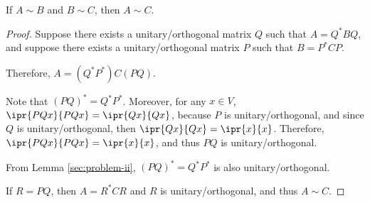 \documentclass[11pt]{scrartcl}
\begin{document}
\begin{lemma}
If $A \sim B$ and $B \sim C$, then $A \sim C$.
\end{lemma}

\begin{proof}
  \hfill

  Suppose there exists a unitary/orthogonal matrix $Q$ such
  that $A = Q^{*} B Q$, and suppose there exists a unitary/orthogonal
  matrix $P$ such that $B = P^{*} C P$.

  Therefore, $A = (Q^{*}P^{*})C (PQ)$.

  Note that $(PQ)^{*} = Q^{*}P^{*}$. Moreover, for any $x\in V$,
  $ \ipr{PQx}{PQx} = \ipr{Qx}{Qx}$, because $P$ is unitary/orthogonal,
  and since $Q$ is unitary/orthogonal, then
  $\ipr{Qx}{Qx} = \ipr{x}{x}$. Therefore,
  $\ipr{PQx}{PQx} = \ipr{x}{x}$, and thus $PQ$ is unitary/orthogonal.

  From Lemma \ref{sec:problem-ii}, $(PQ)^{*} = Q^{*}P^{*}$ is also
  unitary/orthogonal.

  If $R=PQ$, then $A = R^{*}C R$ and $R$ is
  unitary/orthogonal, and thus $A\sim C$.
\end{proof}
\end{document}
